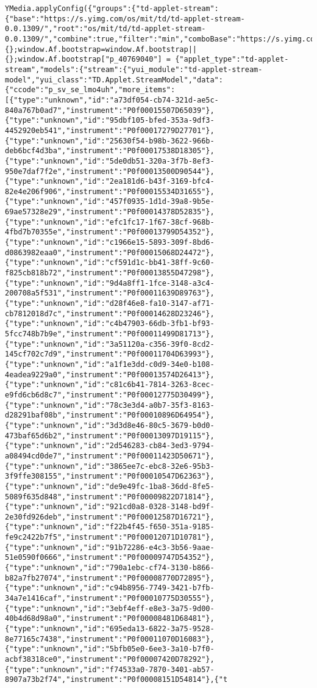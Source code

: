 \begin{verbatim}
YMedia.applyConfig({"groups":{"td-applet-stream":{"base":"https://s.yimg.com/os/mit/td/td-applet-stream-0.0.1309/","root":"os/mit/td/td-applet-stream-0.0.1309/","combine":true,"filter":"min","comboBase":"https://s.yimg.com/zz/combo?","comboSep":"&"}}});window.Af=window.Af||{};window.Af.bootstrap=window.Af.bootstrap||{};window.Af.bootstrap["p_40769040"] = {"applet_type":"td-applet-stream","models":{"stream":{"yui_module":"td-applet-stream-model","yui_class":"TD.Applet.StreamModel","data":{"ccode":"p_sv_se_lmo4uh","more_items":[{"type":"unknown","id":"a73df054-cb74-321d-ae5c-840a767b0ad7","instrument":"P0f00015507D65039"},{"type":"unknown","id":"95dbf105-bfed-353a-9df3-4452920eb541","instrument":"P0f00017279D27701"},{"type":"unknown","id":"25630f54-b98b-3622-966b-deb6bcf4d3ba","instrument":"P0f00017538D18305"},{"type":"unknown","id":"5de0db51-320a-3f7b-8ef3-950e7daf7f2e","instrument":"P0f00013500D90544"},{"type":"unknown","id":"2ea181d6-b43f-3169-bfc4-82e4e206f906","instrument":"P0f00015534D31655"},{"type":"unknown","id":"457f0935-1d1d-39a8-9b5e-69ae57328e29","instrument":"P0f00014378D52835"},{"type":"unknown","id":"efc1fc17-1f67-38cf-968b-4fbd7b70355e","instrument":"P0f00013799D54352"},{"type":"unknown","id":"c1966e15-5893-309f-8bd6-d0863982eaa0","instrument":"P0f00015068D24472"},{"type":"unknown","id":"cf591d1c-bb41-38ff-9c60-f825cb818b72","instrument":"P0f00013855D47298"},{"type":"unknown","id":"9d4a8ff1-1fce-3148-a3c4-200708a5f531","instrument":"P0f00011639D89763"},{"type":"unknown","id":"d28f46e8-fa10-3147-af71-cb7812018d7c","instrument":"P0f00014628D23246"},{"type":"unknown","id":"c4b47903-66db-3fb1-bf93-5fcc748b7b9e","instrument":"P0f00011499D81713"},{"type":"unknown","id":"3a51120a-c356-39f0-8cd2-145cf702c7d9","instrument":"P0f00011704D63993"},{"type":"unknown","id":"a1f1e3dd-c0d9-34e0-b108-4eadea9229a0","instrument":"P0f00013574D26413"},{"type":"unknown","id":"c81c6b41-7814-3263-8cec-e9fd6cb6d8c7","instrument":"P0f00012775D30499"},{"type":"unknown","id":"78c3e3d4-a0b7-35f3-8163-d28291baf08b","instrument":"P0f00010896D64954"},{"type":"unknown","id":"3d3d8e46-80c5-3679-b0d0-473baf65d6b2","instrument":"P0f00013097D19115"},{"type":"unknown","id":"2d546283-cb84-3ed3-9794-a08494cd0de7","instrument":"P0f00011423D50671"},{"type":"unknown","id":"3865ee7c-ebc8-32e6-95b3-3f9ffe308155","instrument":"P0f00010547D62363"},{"type":"unknown","id":"de9e49fc-1ba8-36dd-8fe5-5089f635d848","instrument":"P0f00009822D71814"},{"type":"unknown","id":"921cd0a8-0328-3148-bd9f-2e30fd926deb","instrument":"P0f00012587D16721"},{"type":"unknown","id":"f22b4f45-f650-351a-9185-fe9c2422b7f5","instrument":"P0f00012071D10781"},{"type":"unknown","id":"91b72286-e4c3-3b56-9aae-51e0590f0666","instrument":"P0f00009747D54352"},{"type":"unknown","id":"790a1ebc-cf74-3130-b866-b82a7fb27074","instrument":"P0f00008770D72895"},{"type":"unknown","id":"c94b8956-7749-3421-b7fb-34a7e1416caf","instrument":"P0f00010775D30555"},{"type":"unknown","id":"3ebf4eff-e8e3-3a75-9d00-40b4d68d98a0","instrument":"P0f00008481D68481"},{"type":"unknown","id":"695eda13-6822-3a75-9528-8e77165c7438","instrument":"P0f00011070D16083"},{"type":"unknown","id":"5bfb05e0-6ee3-3a10-b7f0-acbf38318ce0","instrument":"P0f00007420D78292"},{"type":"unknown","id":"f74533a0-7870-3401-ab57-8907a73b2f74","instrument":"P0f00008151D54814"},{"t
\end{verbatim}
